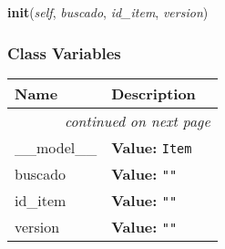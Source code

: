     \label{saip:controllers:version_controller:ItemTableFiller:init}

    \vspace{0.5ex}

\hspace{.8\funcindent}\begin{boxedminipage}{\funcwidth}

    \raggedright \textbf{init}(\textit{self}, \textit{buscado}, \textit{id\_item}, \textit{version})

\setlength{\parskip}{2ex}
\setlength{\parskip}{1ex}
    \end{boxedminipage}



  \subsubsection{Class Variables}

    \vspace{-1cm}
\hspace{\varindent}\begin{longtable}{|p{\varnamewidth}|p{\vardescrwidth}|l}
\cline{1-2}
\cline{1-2} \centering \textbf{Name} & \centering \textbf{Description}& \\
\cline{1-2}
\endhead\cline{1-2}\multicolumn{3}{r}{\small\textit{continued on next page}}\\\endfoot\cline{1-2}
\endlastfoot\raggedright \_\-\_\-m\-o\-d\-e\-l\-\_\-\_\- & \raggedright \textbf{Value:} 
{\tt Item}&\\
\cline{1-2}
\raggedright b\-u\-s\-c\-a\-d\-o\- & \raggedright \textbf{Value:} 
{\tt ""}&\\
\cline{1-2}
\raggedright i\-d\-\_\-i\-t\-e\-m\- & \raggedright \textbf{Value:} 
{\tt ""}&\\
\cline{1-2}
\raggedright v\-e\-r\-s\-i\-o\-n\- & \raggedright \textbf{Value:} 
{\tt ""}&\\
\cline{1-2}
\end{longtable}

